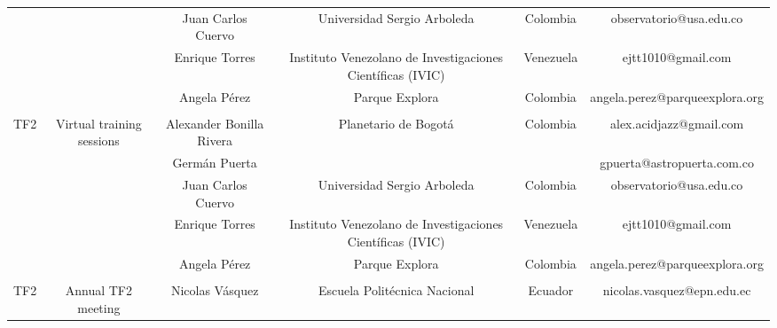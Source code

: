 \begin{table}[H]
{\begin{tabular}{cccccc}
\multicolumn{1}{c|}{} & \multicolumn{1}{c|}{} & \multicolumn{1}{c|}{Juan Carlos Cuervo} & \multicolumn{1}{c|}{Universidad Sergio Arboleda} & \multicolumn{1}{c|}{Colombia} & \multicolumn{1}{c|}{observatorio@usa.edu.co} \\ \cline{3-6} 
\multicolumn{1}{c|}{} & \multicolumn{1}{c|}{} & \multicolumn{1}{c|}{Enrique Torres} & \multicolumn{1}{c|}{Instituto Venezolano de Investigaciones Científicas (IVIC)} & \multicolumn{1}{c|}{Venezuela} & \multicolumn{1}{c|}{ejtt1010@gmail.com} \\ \cline{3-6} 
\multicolumn{1}{c|}{} & \multicolumn{1}{c|}{} & \multicolumn{1}{c|}{Angela Pérez} & \multicolumn{1}{c|}{Parque Explora} & \multicolumn{1}{c|}{Colombia} & \multicolumn{1}{c|}{angela.perez@parqueexplora.org} \\ \cline{2-6} 
 &  &  &  &  &  \\ \hline
\multicolumn{1}{|c|}{TF2} & \multicolumn{1}{c|}{\multirow{5}{*}{Virtual training sessions}} & \multicolumn{1}{c|}{Alexander Bonilla Rivera} & \multicolumn{1}{c|}{Planetario de Bogotá} & \multicolumn{1}{c|}{Colombia} & \multicolumn{1}{c|}{alex.acidjazz@gmail.com} \\ \cline{1-1} \cline{3-6} 
\multicolumn{1}{c|}{} & \multicolumn{1}{c|}{} & \multicolumn{1}{c|}{Germán Puerta} & \multicolumn{1}{c|}{} & \multicolumn{1}{c|}{} & \multicolumn{1}{c|}{gpuerta@astropuerta.com.co} \\ \cline{3-6} 
\multicolumn{1}{c|}{} & \multicolumn{1}{c|}{} & \multicolumn{1}{c|}{Juan Carlos Cuervo} & \multicolumn{1}{c|}{Universidad Sergio Arboleda} & \multicolumn{1}{c|}{Colombia} & \multicolumn{1}{c|}{observatorio@usa.edu.co} \\ \cline{3-6} 
\multicolumn{1}{c|}{} & \multicolumn{1}{c|}{} & \multicolumn{1}{c|}{Enrique Torres} & \multicolumn{1}{c|}{Instituto Venezolano de Investigaciones Científicas (IVIC)} & \multicolumn{1}{c|}{Venezuela} & \multicolumn{1}{c|}{ejtt1010@gmail.com} \\ \cline{3-6} 
\multicolumn{1}{c|}{} & \multicolumn{1}{c|}{} & \multicolumn{1}{c|}{Angela Pérez} & \multicolumn{1}{c|}{Parque Explora} & \multicolumn{1}{c|}{Colombia} & \multicolumn{1}{c|}{angela.perez@parqueexplora.org} \\ \cline{2-6} 
 &  &  &  &  &  \\ \hline
\multicolumn{1}{|c|}{TF2} & \multicolumn{1}{c|}{\multirow{4}{*}{Annual TF2 meeting}} & \multicolumn{1}{c|}{Nicolas Vásquez} & \multicolumn{1}{c|}{Escuela Politécnica Nacional} & \multicolumn{1}{c|}{Ecuador} & \multicolumn{1}{c|}{nicolas.vasquez@epn.edu.ec} \\ \cline{1-1} \cline{3-6} 

\end{tabular}}
\end{table}
